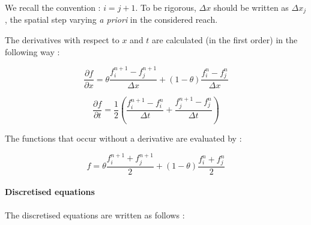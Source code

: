 \vspace{0.5cm}

We recall the convention : $i = j + 1$. To be rigorous, $\Delta x$ should be written as $\Delta x_j$, the spatial step varying \textit{a priori} in the considered reach.

\vspace{0.5cm}

The derivatives with respect to $x$ and $t$ are calculated (in the first order) in the following way :

\begin{equation}
  \frac{\partial f}{\partial x} = \theta \frac{f_{i}^{n+1}-f_{j}^{n+1}}{\Delta x} + (1-\theta) \frac{f_{i}^n - f_{j}^n}{\Delta x}
\end{equation}

\begin{equation}
  \frac{\partial f}{\partial t} = \frac{1}{2} \left ( \frac{f_{i}^{n+1} - f_{i}^n}{\Delta t} + \frac{f_{j}^{n+1} - f_{j}^n}{\Delta t} \right )
\end{equation}

\vspace{0.5cm}

The functions that occur without a derivative are evaluated by :

\begin{equation}
  f = \theta \frac{f_{i}^{n+1} + f_{j}^{n+1}}{2} + (1 - \theta) \frac{f_{i}^n + f_{j}^n}{2}
\end{equation}

\paragraph{Discretised equations\\}

\hspace*{1cm}

The discretised equations are written as follows :

